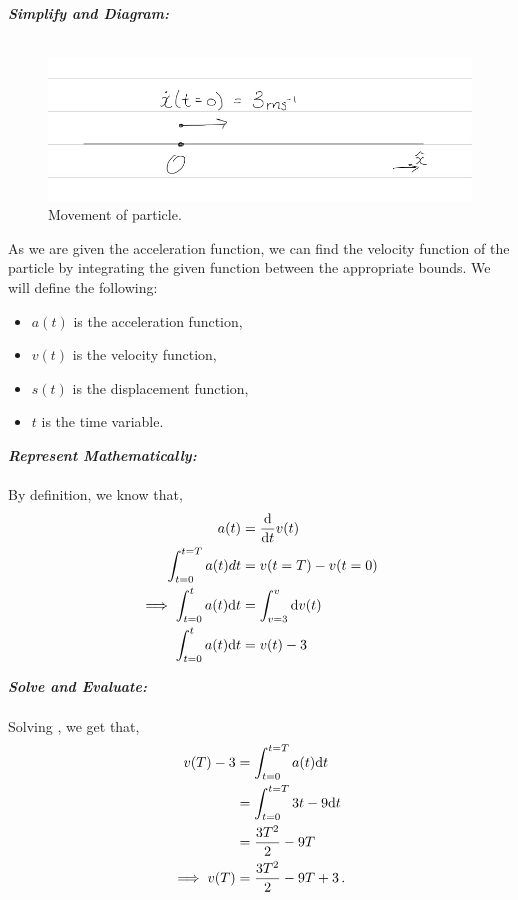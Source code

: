 \begin{subquestions}
\begin{subsubquestions}
	
\textbf{\textit{Simplify and Diagram:}} \\ \\
\begin{figure}[H]
	\begin{center}
		\includegraphics[scale=0.25]{../2009/figures/2009q6-1}
		\caption{\label{2009:q6:Diagram1} Movement of particle.}
	\end{center}
\end{figure}
As we are given the acceleration function, we can find the velocity function of the particle by integrating the given function between the appropriate bounds.
We will define the following: 
\begin{itemize}
	\item $a(t)$ is the acceleration function,
	\item $v(t)$ is the velocity function,
	\item $s(t)$ is the displacement function,
	\item $t$ is the time variable.
\end{itemize}



\textbf{\textit{Represent Mathematically:}} \\ \\
By definition, we know that,
\begin{align}
	a(t) & = \frac{\mathrm{d}}{\mathrm{d}t}v(t) \nonumber \\
	\int_{t=0}^{t=T} a(t) dt &= v(t=T) - v(t=0) \\
	\implies \int_{t=0}^{t}a(t)\mathrm{d} t & = \int_{v=3}^{v} \mathrm{d} v(t) \nonumber \\
	\int_{t=0}^{t}a(t)\mathrm{d} t & = v(t)-3 \label{2009:q6:VEqn1}
\end{align}




\textbf{\textit{Solve and Evaluate:}} \\ \\
Solving , we get that,
\begin{align}
	v(T)-3 & = \int_{t=0}^{t=T}a(t)\mathrm{d} t \nonumber \\
	     & = \int_{t=0}^{t=T} 3t-9 \mathrm{d} t \nonumber \\
	     & = \frac{3T^2}{2}-9T \nonumber \\
\implies v(T) & = \frac{3T^2}{2}-9T +3 \,.
\end{align}


\end{subsubquestions}
\end{subquestions}
